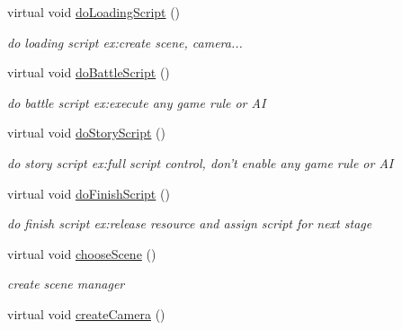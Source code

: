 \begin{DoxyCompactItemize}
\item 
\hypertarget{class_stage4_aec4a78a3ec32b58513c09b34d34c24e3}{
virtual void \hyperlink{class_stage4_aec4a78a3ec32b58513c09b34d34c24e3}{doLoadingScript} ()}
\label{class_stage4_aec4a78a3ec32b58513c09b34d34c24e3}

\begin{DoxyCompactList}\small\item\em do loading script ex:create scene, camera... \end{DoxyCompactList}\item 
\hypertarget{class_stage4_ad3f985aa65c2ed8304eb38f0c139a9ec}{
virtual void \hyperlink{class_stage4_ad3f985aa65c2ed8304eb38f0c139a9ec}{doBattleScript} ()}
\label{class_stage4_ad3f985aa65c2ed8304eb38f0c139a9ec}

\begin{DoxyCompactList}\small\item\em do battle script ex:execute any game rule or AI \end{DoxyCompactList}\item 
\hypertarget{class_stage4_aebed499a06262f9a16eef511a83f8c14}{
virtual void \hyperlink{class_stage4_aebed499a06262f9a16eef511a83f8c14}{doStoryScript} ()}
\label{class_stage4_aebed499a06262f9a16eef511a83f8c14}

\begin{DoxyCompactList}\small\item\em do story script ex:full script control, don't enable any game rule or AI \end{DoxyCompactList}\item 
\hypertarget{class_stage4_af456e6782fcf031bb6eb7363792d3794}{
virtual void \hyperlink{class_stage4_af456e6782fcf031bb6eb7363792d3794}{doFinishScript} ()}
\label{class_stage4_af456e6782fcf031bb6eb7363792d3794}

\begin{DoxyCompactList}\small\item\em do finish script ex:release resource and assign script for next stage \end{DoxyCompactList}\item 
\hypertarget{class_stage4_ae0bd8f2dc20bc51cf99c14ed7d57614d}{
virtual void \hyperlink{class_stage4_ae0bd8f2dc20bc51cf99c14ed7d57614d}{chooseScene} ()}
\label{class_stage4_ae0bd8f2dc20bc51cf99c14ed7d57614d}

\begin{DoxyCompactList}\small\item\em create scene manager \end{DoxyCompactList}\item 
\hypertarget{class_stage4_a7d580c26e014ce3f79a74a1c20e27ab4}{
virtual void \hyperlink{class_stage4_a7d580c26e014ce3f79a74a1c20e27ab4}{createCamera} ()}
\label{class_stage4_a7d580c26e014ce3f79a74a1c20e27ab4}


\end{DoxyCompactItemize}
